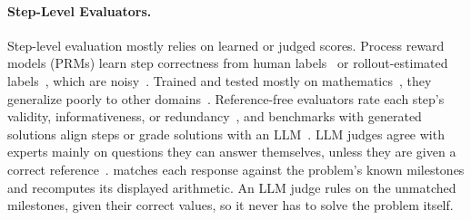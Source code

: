 \paragraph{Step-Level Evaluators.} Step-level evaluation mostly relies on learned or judged scores.
Process reward models (PRMs) learn step correctness from human labels~\citep{lightman2023verify} or
rollout-estimated labels~\citep{wang2023mathshepherd}, which are noisy~\citep{zhang2025prmlessons}.
Trained and tested mostly on mathematics~\citep{zheng2024processbench, song2025prmbench}, they
generalize poorly to other domains~\citep{zeng2025versaprm}.
Reference-free evaluators rate each step's validity, informativeness, or
redundancy~\citep{golovneva2022roscoe, prasad2023receval, xia2024reasoneval}, and benchmarks with
generated solutions align steps or grade solutions with an
LLM~\citep{xie2025finchain, fan2024hardmath}.
LLM judges agree with experts mainly on questions they can answer themselves, unless they are given
a correct reference~\citep{krumdick2026nofreelabels}.
\ourdataset matches each response against the problem's known milestones and recomputes its
displayed arithmetic.
An LLM judge rules on the unmatched milestones, given their correct values, so it never has to
solve the problem itself.
